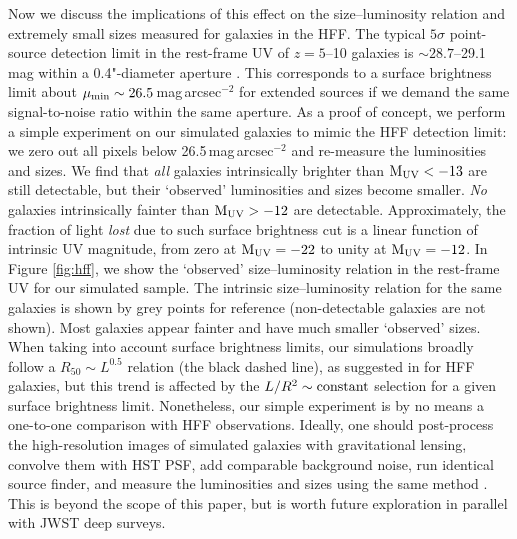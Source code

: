 \documentclass[useAMS,usenatbib]{mn2e}
\newcommand{\muv}{{\rm M_{UV}}}
\begin{document}
Now we discuss the implications of this effect on the size--luminosity relation and extremely small sizes measured for galaxies in the HFF. The typical $5\sigma$ point-source detection limit in the rest-frame UV of $z=5$--10 galaxies is $\sim28.7$--29.1\,mag within a 0.4"-diameter aperture \citep{coe.2015:hubble.frontier.field}. This corresponds to a surface brightness limit about $\mu_{\rm min}\sim26.5$\,mag\,arcsec$^{-2}$ for extended sources if we demand the same signal-to-noise ratio within the same aperture. As a proof of concept, we perform a simple experiment on our simulated galaxies to mimic the HFF detection limit: we zero out all pixels below 26.5\,mag\,arcsec$^{-2}$ and re-measure the luminosities and sizes. We find that {\em all} galaxies intrinsically brighter than $\muv<-13$ are still detectable, but their `observed' luminosities and sizes become smaller. {\em No} galaxies intrinsically fainter than $\muv>-12$ are detectable. Approximately, the fraction of light {\em lost} due to such surface brightness cut is a linear function of intrinsic UV magnitude, from zero at $\muv=-22$ to unity at $\muv=-12$. In Figure \ref{fig:hff}, we show the `observed' size--luminosity relation in the rest-frame UV for our simulated sample. The intrinsic size--luminosity relation for the same galaxies is shown by grey points for reference (non-detectable galaxies are not shown). Most galaxies appear fainter and have much smaller `observed' sizes.  When taking into account surface brightness limits, our simulations broadly follow a $R_{50}\sim L^{0.5}$ relation (the black dashed line), as suggested in \citet{bouwens.2017:small.galaxy.sizes} for HFF galaxies, but this trend is affected by the $L/R^2\sim{\rm constant}$ selection for a given surface brightness limit. Nonetheless, our simple experiment is by no means a one-to-one comparison with HFF observations. Ideally, one should post-process the high-resolution images of simulated galaxies with gravitational lensing, convolve them with HST PSF, add comparable background noise, run identical source finder, and measure the luminosities and sizes using the same method \citep[e.g.][]{price.2017:size.recovery.fire}. This is beyond the scope of this paper, but is worth future exploration in parallel with JWST deep surveys.
\end{document}
